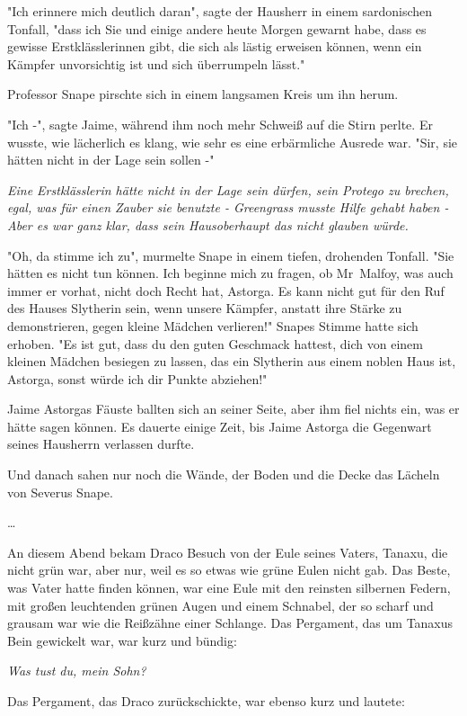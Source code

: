 {"Ich erinnere mich deutlich daran", sagte der Hausherr in einem sardonischen Tonfall, "dass ich Sie und einige andere heute Morgen gewarnt habe, dass es gewisse Erstklässlerinnen gibt, die sich als lästig erweisen können, wenn ein Kämpfer unvorsichtig ist und sich überrumpeln lässt."

Professor Snape pirschte sich in einem langsamen Kreis um ihn herum.

"Ich -", sagte Jaime, während ihm noch mehr Schweiß auf die Stirn perlte. Er wusste, wie lächerlich es klang, wie sehr es eine erbärmliche Ausrede war. "Sir, sie hätten nicht in der Lage sein sollen -"

\emph{Eine Erstklässlerin hätte nicht in der Lage sein dürfen, sein Protego zu brechen, egal, was für einen Zauber sie benutzte - Greengrass musste Hilfe gehabt haben - Aber es war ganz klar, dass sein Hausoberhaupt das nicht glauben würde.}

"Oh, da stimme ich zu", murmelte Snape in einem tiefen, drohenden Tonfall. "Sie hätten es nicht tun können. Ich beginne mich zu fragen, ob Mr~Malfoy, was auch immer er vorhat, nicht doch Recht hat, Astorga. Es kann nicht gut für den Ruf des Hauses Slytherin sein, wenn unsere Kämpfer, anstatt ihre Stärke zu demonstrieren, gegen kleine Mädchen verlieren!" Snapes Stimme hatte sich erhoben. "Es ist gut, dass du den guten Geschmack hattest, dich von einem kleinen Mädchen besiegen zu lassen, das ein Slytherin aus einem noblen Haus ist, Astorga, sonst würde ich dir Punkte abziehen!"

Jaime Astorgas Fäuste ballten sich an seiner Seite, aber ihm fiel nichts ein, was er hätte sagen können. Es dauerte einige Zeit, bis Jaime Astorga die Gegenwart seines Hausherrn verlassen durfte.

Und danach sahen nur noch die Wände, der Boden und die Decke das Lächeln von Severus Snape.

…

An diesem Abend bekam Draco Besuch von der Eule seines Vaters, Tanaxu, die nicht grün war, aber nur, weil es so etwas wie grüne Eulen nicht gab. Das Beste, was Vater hatte finden können, war eine Eule mit den reinsten silbernen Federn, mit großen leuchtenden grünen Augen und einem Schnabel, der so scharf und grausam war wie die Reißzähne einer Schlange. Das Pergament, das um Tanaxus Bein gewickelt war, war kurz und bündig:

\emph{Was tust du, mein Sohn?}

Das Pergament, das Draco zurückschickte, war ebenso kurz und lautete:

}
